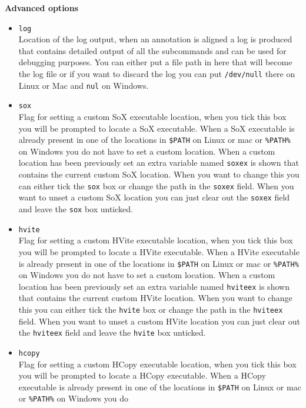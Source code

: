 \begin{itemize}
		\textbf{Advanced options}
		\begin{itemize}
			\item \texttt{log}\\
				Location of the log output, when an annotation is aligned a log is
				produced that contains detailed output of all the subcommands and can
				be used for debugging purposes. You can either put a file path in here
				that will become the log file or if you want to discard the log you can
				put \texttt{/dev/null} there on Linux or Mac and \texttt{nul} on
				Windows.
			\item \texttt{sox}\\
				Flag for setting a custom SoX executable location, when you tick this
				box you will be prompted to locate a SoX executable. When a SoX
				executable is already present in one of the locations in
				\texttt{\$PATH} on Linux or mac or \texttt{\%PATH\%} on Windows you do
				not have to set a custom location. When a custom location has been
				previously set an extra variable named \texttt{soxex} is shown that
				contains the current custom SoX location. When you want to change this
				you can either tick the \texttt{sox} box or change the path in the
				\texttt{soxex} field.  When you want to unset a custom SoX location you
				can just clear out the \texttt{soxex} field and leave the \texttt{sox}
				box unticked.
			\item \texttt{hvite}\\
				Flag for setting a custom HVite executable location, when you tick this
				box you will be prompted to locate a HVite executable. When a HVite
				executable is already present in one of the locations in
				\texttt{\$PATH} on Linux or mac or \texttt{\%PATH\%} on Windows you do
				not have to set a custom location. When a custom location has been
				previously set an extra variable named \texttt{hviteex} is shown that
				contains the current custom HVite location. When you want to change
				this you can either tick the \texttt{hvite} box or change the path in
				the \texttt{hviteex} field. When you want to unset a custom HVite
				location you can just clear out the \texttt{hviteex} field and leave
				the \texttt{hvite} box unticked.
			\item \texttt{hcopy}\\
				Flag for setting a custom HCopy executable location, when you tick this
				box you will be prompted to locate a HCopy executable. When a HCopy
				executable is already present in one of the locations in
				\texttt{\$PATH} on Linux or mac or \texttt{\%PATH\%} on Windows you do

\end{itemize}
\end{itemize}
